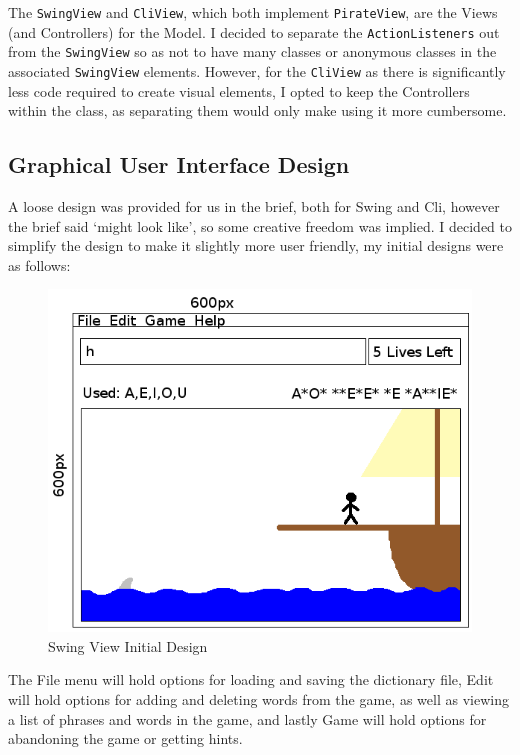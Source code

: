 \documentclass[a4paper, 11pt]{article}
\begin{document}
The \texttt{SwingView} and \texttt{CliView}, which both implement \texttt{PirateView}, are the Views (and Controllers) for the Model. I decided to separate the \texttt{ActionListeners} out from the \texttt{SwingView} so as not to have many classes or anonymous classes in the associated \texttt{SwingView} elements. However, for the \texttt{CliView} as there is significantly less code required to create visual elements, I opted to keep the Controllers within the class, as separating them would only make using it more cumbersome. 

\subsection{Graphical User Interface Design}

A loose design was provided for us in the brief, both for Swing and Cli, however the brief said `might look like', so some creative freedom was implied. I decided to simplify the design to make it slightly more user friendly, my initial designs were as follows:

\begin{figure}[H]
\centering
\includegraphics[scale=0.5]{./res/SwingViewDesign.png}
\caption{Swing View Initial Design}
\label{SwingView}
\end{figure}

The File menu will hold options for loading and saving the dictionary file, Edit will hold options for adding and deleting words from the game, as well as viewing a list of phrases and words in the game, and lastly Game will hold options for abandoning the game or getting hints.
\end{document}
